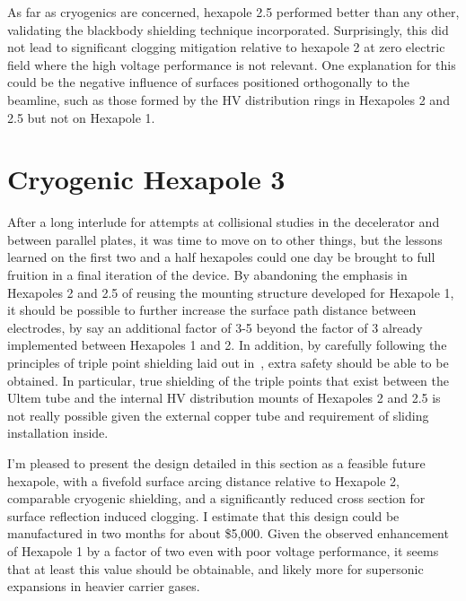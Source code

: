 As far as cryogenics are concerned, hexapole 2.5 performed better than any other, validating the blackbody shielding technique incorporated.
Surprisingly, this did not lead to significant clogging mitigation relative to hexapole 2 at zero electric field where the high voltage performance is not relevant.
One explanation for this could be the negative influence of surfaces positioned orthogonally to the beamline, such as those formed by the HV distribution rings in Hexapoles 2 and 2.5 but not on Hexapole 1.


\section{Cryogenic Hexapole 3}

After a long interlude for attempts at collisional studies in the decelerator and between parallel plates, it was time to move on to other things, but the lessons learned on the first two and a half hexapoles could one day be brought to full fruition in a final iteration of the device.
By abandoning the emphasis in Hexapoles 2 and 2.5 of reusing the mounting structure developed for Hexapole 1, it should be possible to further increase the surface path distance between electrodes, by say an additional factor of 3-5 beyond the factor of 3 already implemented between Hexapoles 1 and 2.
In addition, by carefully following the principles of triple point shielding laid out in~\citep[Sec.~4.3.3]{Faircloth2013}, extra safety should be able to be obtained.
In particular, true shielding of the triple points that exist between the Ultem tube and the internal HV distribution mounts of Hexapoles 2 and 2.5 is not really possible given the external copper tube and requirement of sliding installation inside.

I'm pleased to present the design detailed in this section as a feasible future hexapole, with a fivefold surface arcing distance relative to Hexapole 2, comparable cryogenic shielding, and a significantly reduced cross section for surface reflection induced clogging.
I estimate that this design could be manufactured in two months for about \$5,000.
Given the observed enhancement of Hexapole 1 by a factor of two even with poor voltage performance, it seems that at least this value should be obtainable, and likely more for supersonic expansions in heavier carrier gases.














\ifx\justbeingincluded\undefined

\fi